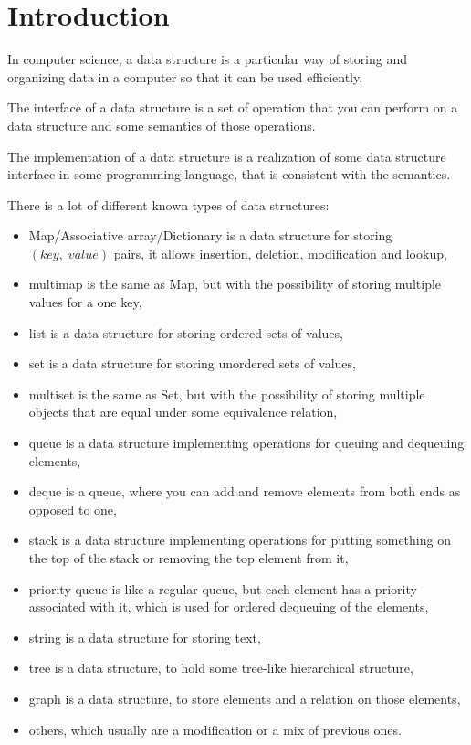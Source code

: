 \documentclass[a4paper,11pt]{article}
\begin{document}
\tableofcontents

\vfill

\section{Introduction} \label{sec:intro}
	In computer science, a data structure is a particular way of storing and organizing data in a computer so that
	it can be used efficiently\cite{Wids}.

	The interface of a data structure is a set of operation that you can perform on a data structure and some
	semantics of those operations.

	The implementation of a data structure is a realization of some data structure interface in some programming
	language, that is consistent with the semantics.

	There is a lot of different known types of data structures:
	\begin{itemize}
		\item Map/Associative array/Dictionary is a data structure for storing $(key,\;value)$ pairs, it allows
			insertion, deletion, modification and lookup,
		\item multimap is the same as Map, but with the possibility of storing multiple values for a one key,
		\item list is a data structure for storing ordered sets of values,
		\item set is a data structure for storing unordered sets of values,
		\item multiset is the same as Set, but with the possibility of storing multiple objects that are equal
			under some equivalence relation,
		\item queue is a data structure implementing operations for queuing and dequeuing elements,
		\item deque is a queue, where you can add and remove elements from both ends as opposed to one,
		\item stack is a data structure implementing operations for putting something on the top of the stack or
			removing the top element from it,
		\item priority queue is like a regular queue, but each element has a priority associated with it, which
			is used for ordered dequeuing of the elements,
		\item string is a data structure for storing text,
		\item tree is a data structure, to hold some tree-like hierarchical structure,
		\item graph is a data structure, to store elements and a relation on those elements,
		\item others, which usually are a modification or a mix of previous ones.
	\end{itemize}
\end{document}
